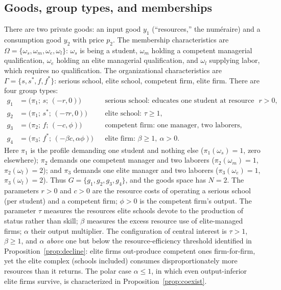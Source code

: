 \documentclass[12pt,letterpaper]{article}
\theoremstyle{definition}
\begin{document}
\subsection{Goods, group types, and memberships}

There are two private goods: an input good $y_1$ (``resources,'' the num\'{e}raire) and a consumption good $y_2$ with price $p_2$.
The membership characteristics are $\Omega=\{\omega_s,\omega_m,\omega_e,\omega_l\}$: $\omega_s$ is being a student, $\omega_m$ holding a competent managerial qualification, $\omega_e$ holding an elite managerial qualification, and $\omega_l$ supplying labor, which requires no qualification.
The organizational characteristics are $\Gamma=\{s,s^\ast,f,f^\ast\}$: serious school, elite school, competent firm, elite firm.
There are four group types:
\begin{align*}
  g_1 &= \big(\pi_1;\, s;\, (-r,0)\big)
    && \text{serious school: educates one student at resource cost } r>0,\\
  g_2 &= \big(\pi_1;\, s^\ast;\, (-\tau r,0)\big)
    && \text{elite school: } \tau\geq 1,\\
  g_3 &= \big(\pi_2;\, f;\, (-c,\phi)\big)
    && \text{competent firm: one manager, two laborers},\\
  g_4 &= \big(\pi_3;\, f^\ast;\, (-\beta c,\alpha\phi)\big)
    && \text{elite firm: } \beta\geq 1,\ \alpha>0.
\end{align*}
Here $\pi_1$ is the profile demanding one student and nothing else ($\pi_1(\omega_s)=1$, zero elsewhere); $\pi_2$ demands one competent manager and two laborers ($\pi_2(\omega_m)=1$, $\pi_2(\omega_l)=2$); and $\pi_3$ demands one elite manager and two laborers ($\pi_3(\omega_e)=1$, $\pi_3(\omega_l)=2$).
Thus $G=\{g_1,g_2,g_3,g_4\}$, and the goods space has $N=2$.
The parameters $r>0$ and $c>0$ are the resource costs of operating a serious school (per student) and a competent firm; $\phi>0$ is the competent firm's output.
The parameter $\tau$ measures the resources elite schools devote to the production of status rather than skill; $\beta$ measures the excess resource use of elite-managed firms; $\alpha$ their output multiplier.
The configuration of central interest is $\tau>1$, $\beta\geq 1$, and $\alpha$ \emph{above} one but below the resource-efficiency threshold identified in Proposition~\ref{prop:decline}: elite firms out-produce competent ones firm-for-firm, yet the elite complex (schools included) consumes disproportionately more resources than it returns.
The polar case $\alpha\leq 1$, in which even output-inferior elite firms survive, is characterized in Proposition~\ref{prop:coexist}.
\end{document}
